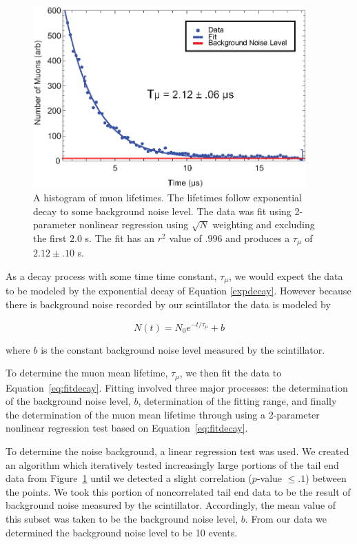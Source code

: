 \begin{figure}[htbp]
\begin{center}
\includegraphics[height=70mm]{./figures/muon_decay.eps}
\caption{A histogram of muon lifetimes. The lifetimes follow exponential decay to some background noise level.  The data was fit using 2-parameter nonlinear regression using $\sqrt{N}$ weighting and excluding the first $2.0$ \mu s.  The fit has an $r^{2}$ value of $.996$ and produces a $\tau_{\mu}$ of $2.12 \pm .10$ \mu s.}
\label{fig:muondecay}
\end{center}
\end{figure}

 As a decay process with some time time constant, $\tau_{\mu}$, we
would expect the data to be modeled by the exponential decay of Equation \eqref{expdecay}.  However because there is background noise recorded by our
scintillator the data is modeled by

\begin{equation}
\label{eq:fitdecay}
N(t) = N_{0} e^{-t/\tau_{\mu}}+b
\end{equation}

where $b$ is the constant background noise level measured by the scintillator. 

To determine the muon mean lifetime, $\tau_{\mu}$, we then fit the
data to Equation~\eqref{eq:fitdecay}.  Fitting involved three major processes: the
determination of the background noise level, $b$, determination of the
fitting range, and finally the determination of the muon mean lifetime
through using a 2-parameter nonlinear regression test based on Equation~\eqref{eq:fitdecay}.

To determine the noise background, a linear regression test was used.
We created an algorithm which iteratively tested increasingly large
portions of the tail end data from Figure~\ref{fig:muondecay} until we detected a
slight correlation ($p$-value $\leq .1$) between the points.  We took
this portion of noncorrelated tail end data to be the result of
background noise measured by the scintillator.  Accordingly, the mean
value of this subset was taken to be the background noise level,
$b$. From our data we determined the background noise level to be 10
events.

